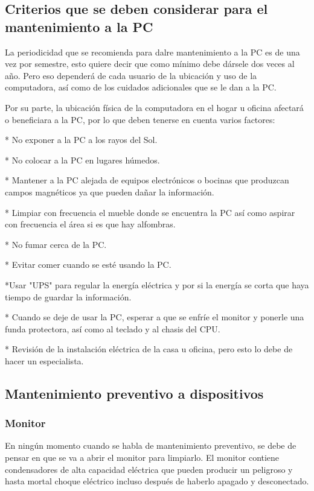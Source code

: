 \documentclass[landscape]{article}
\begin{document}
\begin{multicols}{3}
\columnbreak


\subsection*{Criterios que se deben considerar para el mantenimiento a la PC}

La periodicidad que se recomienda para dalre mantenimiento a la PC es de una vez por semestre, esto quiere decir que como m\'inimo debe d\'arsele dos veces al a\~no. Pero eso depender\'a de cada usuario de la ubicaci\'on y uso de la computadora, as\'i como de los cuidados adicionales que se le dan a la PC.

Por su parte, la ubicaci\'on f\'isica de la computadora en el hogar u oficina afectar\'a o beneficiara a la PC, por lo que deben tenerse en cuenta varios factores:

* No exponer a la PC a los rayos del Sol.

* No colocar a la PC en lugares h\'umedos.

* Mantener a la PC alejada de equipos electr\'onicos o bocinas que produzcan campos magn\'eticos ya que pueden da\~nar la informaci\'on.

* Limpiar con frecuencia el mueble donde se encuentra la PC as\'i como aspirar con frecuencia el \'area si es que hay alfombras.

* No fumar cerca de la PC.

* Evitar comer cuando se est\'e usando la PC.

*Usar "UPS" para regular la energ\'ia el\'ectrica y por si la energ\'ia se corta que haya tiempo de guardar la informaci\'on.

* Cuando se deje de usar la PC, esperar a que se enfr\'ie el monitor y ponerle una funda protectora, as\'i como al teclado y al chasis del CPU.

* Revisi\'on de la instalaci\'on el\'ectrica de la casa u oficina, pero esto lo debe de hacer un especialista.


\subsection*{Mantenimiento preventivo a dispositivos}

\subsubsection*{Monitor}

En ning\'un momento cuando se habla de mantenimiento preventivo, se debe de pensar en que se va a abrir el monitor para limpiarlo. El monitor contiene condensadores de alta capacidad el\'ectrica que pueden producir un peligroso y hasta mortal choque el\'ectrico incluso despu\'es de haberlo apagado y desconectado.


\end{multicols}
\end{document}

